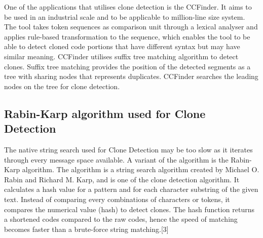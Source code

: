 One of the applications that utilises clone detection is the CCFinder. It aims to be used in an industrial scale and to be applicable to million-line size system. The tool takes token sequences as comparison unit through a lexical analyser and applies rule-based transformation to the sequence, which enables the tool to be able to detect cloned code portions that have different syntax but may have similar meaning. CCFinder utilises suffix tree matching algorithm to detect clones. Suffix tree matching provides the position of the detected segments as a tree with sharing nodes that represents duplicates. CCFinder searches the leading nodes on the tree for clone detection.

\subsection{Rabin-Karp algorithm used for Clone Detection}
The native string search used for Clone Detection may be too slow as it iterates through every message space available. A variant of the algorithm is the Rabin-Karp algorithm. The algorithm is a string search algorithm created by Michael O. Rabin and Richard M. Karp, and is one of the clone detection algorithm. It calculates a hash value for a pattern and for each character substring of the given text. Instead of comparing every combinations of characters or tokens, it compares the numerical value (hash) to detect clones. The hash function returns a shortened codes compared to the raw codes, hence the speed of matching becomes faster than a brute-force string matching.[3]
\break